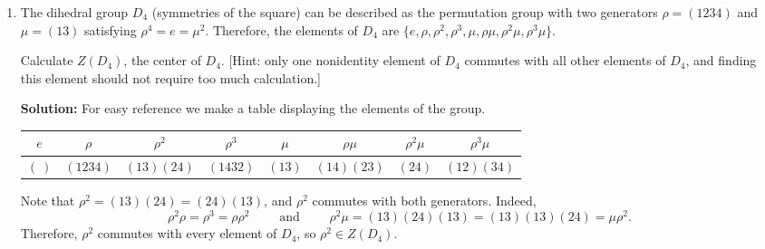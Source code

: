\documentclass[fleqn,12pt]{article}
\newcommand{\<}{\ensuremath{\langle}}
\renewcommand{\>}{\ensuremath{\rangle}}
\begin{document}
\begin{enumerate}[{\bf 1.}]
\begin{enumerate}
\bigskip

\item
The dihedral group $D_4$ (symmetries of the square) can be
described as the permutation group with two generators 
$\rho = (1234)$ and $\mu = (13)$ satisfying $\rho^4= e = \mu^2$.
Therefore, the elements of $D_4$ are 
$\{e, \rho, \rho^2, \rho^3, \mu, \rho \mu, \rho^2 \mu, \rho^3 \mu\}$.

Calculate $Z(D_4)$, the center of $D_4$. [Hint: only one nonidentity
element of $D_4$ commutes with all other elements of $D_4$, and finding
this element should not require too much calculation.]
 

\medskip

\noindent
{\bf Solution:} 
For easy reference we make a table displaying the elements of the group.
\begin{center}
\begin{tabular}{c|c|c|c|c|c|c|c}
$e$ & $ \rho$ & $ \rho^2$ & $ \rho^3$ & $ \mu$ & $ \rho \mu$ & $ \rho^2 \mu$ & $ \rho^3 \mu$\\
\hline
$(~)$ & $ (1234)$ & $ (13)(24)$ & $ (1432)$ & $ (13)$ & $ (14)(23)$ & $ (24)$ & $(12)(34)$
\end{tabular}

\end{center}
Note that $\rho^2 = (13)(24) = (24)(13)$, and $\rho^2$ 
commutes with both generators. Indeed,
\[\rho^2 \rho = \rho^3 = \rho \rho^2 \qquad \text{ and  } \qquad
\rho^2 \mu = (13)(24)(13) = (13)(13)(24) = \mu \rho^2.
\]
Therefore, $\rho^2$ commutes with every element of $D_4$, 
so $\rho^2 \in Z(D_4)$.


\end{enumerate}
\end{enumerate}
\end{document}
